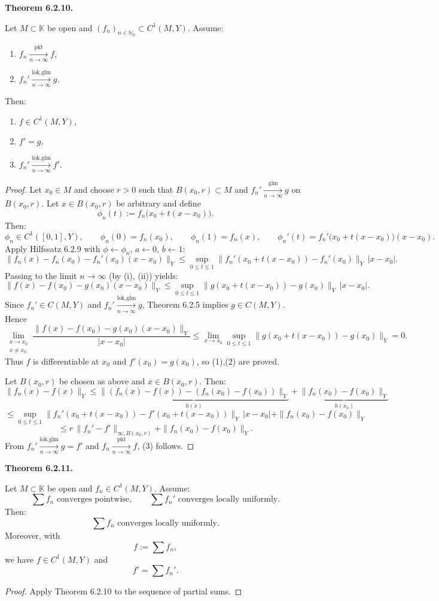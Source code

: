 \documentclass[12pt]{article}
\newenvironment{satz}[1]{%
  \par\vspace{6pt}\noindent\textbf{Theorem #1.}\itshape\space
}{%
  \par\vspace{6pt}
}
\begin{document}
\begin{satz}{6.2.10}
Let $M\subset \mathbb K$ be open and $(f_n)_{n\in\mathbb N_0}\subset C^1(M,Y)$. Assume:
\begin{enumerate}
    \item[\textit{i.}] $f_n \xrightarrow[n\to\infty]{\mathrm{pkt}} f$,
    \item[\textit{ii.}] $f_n' \xrightarrow[n\to\infty]{\mathrm{lok.glm}} g$.
\end{enumerate}
Then:
\begin{enumerate}
    \item $f\in C^1(M,Y)$,
    \item $f'=g$,
    \item $f_n' \xrightarrow[n\to\infty]{\mathrm{lok.glm}} f'$.
\end{enumerate}
\end{satz}

\begin{proof}
Let $x_0\in M$ and choose $r>0$ such that $B(x_0,r)\subset M$ and
$f_n' \xrightarrow[n\to\infty]{\mathrm{glm}} g$ on $B(x_0,r)$.
Let $x\in B(x_0,r)$ be arbitrary and define
\[
\phi_n(t):=f_n\bigl(x_0+t(x-x_0)\bigr).
\]
Then:
\[
\phi_n\in C^1([0,1],Y),\qquad
\phi_n(0)=f_n(x_0),\qquad
\phi_n(1)=f_n(x),\qquad
\phi_n'(t)=f_n'\bigl(x_0+t(x-x_0)\bigr)(x-x_0).
\]
Apply Hilfssatz 6.2.9 with $\phi\leftarrow\phi_n$, $a\leftarrow0$, $b\leftarrow1$:
\[
\|f_n(x)-f_n(x_0)-f_n'(x_0)(x-x_0)\|_Y
\le
\sup_{0\le t\le1}\|f_n'(x_0+t(x-x_0))-f_n'(x_0)\|_Y\,|x-x_0|.
\]
Passing to the limit $n\to\infty$ (by (i), (ii)) yields:
\[
\|f(x)-f(x_0)-g(x_0)(x-x_0)\|_Y
\le
\sup_{0\le t\le1}\|g(x_0+t(x-x_0))-g(x_0)\|_Y\,|x-x_0|.
\]
Since $f_n'\in C(M,Y)$ and $f_n' \xrightarrow[n\to\infty]{\mathrm{lok.glm}} g$, Theorem 6.2.5 implies
$g\in C(M,Y)$. Hence
\[
\lim_{\substack{x\to x_0\\x\neq x_0}}
\frac{\|f(x)-f(x_0)-g(x_0)(x-x_0)\|_Y}{|x-x_0|}
\le
\lim_{x\to x_0}\sup_{0\le t\le1}\|g(x_0+t(x-x_0))-g(x_0)\|_Y
=0.
\]
Thus $f$ is differentiable at $x_0$ and $f'(x_0)=g(x_0)$, so (1),(2) are proved.

Let $B(x_0,r)$ be chosen as above and $x\in B(x_0,r)$. Then:
\[
\|f_n(x)-f(x)\|_Y
\le
\underbrace{\|(f_n(x)-f(x))-(f_n(x_0)-f(x_0))\|_Y}_{h(x)}
+\underbrace{\|f_n(x_0)-f(x_0)\|_Y}_{h(x_0)}
\]
\[
\le
\sup_{0\le t\le1}\|f_n'(x_0+t(x-x_0))-f'(x_0+t(x-x_0))\|_Y\,|x-x_0|
+\|f_n(x_0)-f(x_0)\|_Y
\]
\[
\le
r\,\|f_n'-f'\|_{\infty,B(x_0,r)}+\|f_n(x_0)-f(x_0)\|_Y.
\]
From $f_n' \xrightarrow[n\to\infty]{\mathrm{lok.glm}} g=f'$ and
$f_n \xrightarrow[n\to\infty]{\mathrm{pkt}} f$, (3) follows.
\end{proof}

\begin{satz}{6.2.11}
Let $M\subset\mathbb K$ be open and $f_n\in C^1(M,Y)$. Assume:
\[
\sum f_n \text{ converges pointwise},
\qquad
\sum f_n' \text{ converges locally uniformly}.
\]
Then:
\[
\sum f_n \text{ converges locally uniformly}.
\]
Moreover, with
\[
f:=\sum f_n,
\]
we have $f\in C^1(M,Y)$ and
\[
f'=\sum f_n'.
\]
\end{satz}

\begin{proof}
Apply Theorem 6.2.10 to the sequence of partial sums.
\end{proof}
\end{document}

